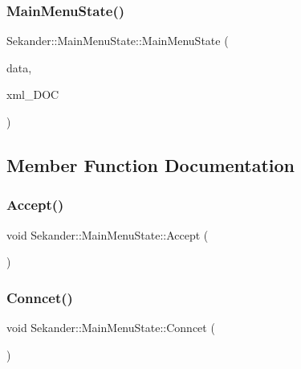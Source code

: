 \subsubsection{\texorpdfstring{Main\+Menu\+State()}{MainMenuState()}\hspace{0.1cm}{\footnotesize\ttfamily [2/2]}}
{\footnotesize\ttfamily Sekander\+::\+Main\+Menu\+State\+::\+Main\+Menu\+State (\begin{DoxyParamCaption}\item[{\hyperlink{namespaceSekander_a1d69b002ba2d23020901c28f0def5e16}{Game\+Data\+Ref}}]{data,  }\item[{const char $\ast$}]{xml\+\_\+\+D\+OC }\end{DoxyParamCaption})}



\subsection{Member Function Documentation}
\mbox{\label{classSekander_1_1MainMenuState_ab70a367c525cfb7bc8e0f5497c1159a9}} 
\subsubsection{\texorpdfstring{Accept()}{Accept()}}
{\footnotesize\ttfamily void Sekander\+::\+Main\+Menu\+State\+::\+Accept (\begin{DoxyParamCaption}{ }\end{DoxyParamCaption})\hspace{0.3cm}{\ttfamily [inline]}}

\mbox{\label{classSekander_1_1MainMenuState_ab29df2f2392625cddc8c414f9a67a320}} 
\subsubsection{\texorpdfstring{Conncet()}{Conncet()}}
{\footnotesize\ttfamily void Sekander\+::\+Main\+Menu\+State\+::\+Conncet (\begin{DoxyParamCaption}{ }\end{DoxyParamCaption})\hspace{0.3cm}{\ttfamily [inline]}}


